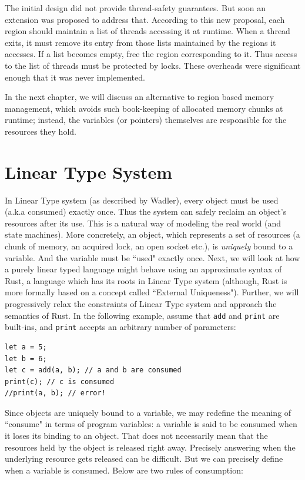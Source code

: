 \documentclass[11pt]{report}
\begin{document}
The initial design did not provide thread-safety guarantees. But soon an extension was proposed\cite{grossmanthread} to address that. According to this new proposal, each region should maintain a list of threads accessing it at runtime. When a thread exits, it must remove its entry from those lists maintained by the regions it accesses. If a list becomes empty, free the region corresponding to it. Thus access to the list of threads must be protected by locks. These overheads were significant enough that it was never implemented.

In the next chapter, we will discuss an alternative to region based memory management, which avoids such book-keeping of allocated memory chunks at runtime; instead, the variables (or pointers) themselves are responsible for the resources they hold.

\chapter{Linear Type System}

In Linear Type system (as described by Wadler\cite{linearchange}), every object must be used (a.k.a consumed) exactly once. Thus the system can safely reclaim an object's resources after its use. This is a natural way of modeling the real world (and state machines). More concretely, an object, which represents a set of resources (a chunk of memory, an acquired lock, an open socket etc.), is \textit{uniquely} bound to a variable. And the variable must be ``used" exactly once. Next, we will look at how a purely linear typed language might behave using an approximate syntax of Rust, a language which has its roots in Linear Type system (although, Rust is more formally based on a concept called ``External Uniqueness"\cite{externuniq}). Further, we will progressively relax the constraints of Linear Type system and approach the semantics of Rust. In the following example, assume that \texttt{add} and \texttt{print} are built-ins, and \texttt{print} accepts an arbitrary number of parameters:

\begin{lstlisting}
let a = 5;
let b = 6;
let c = add(a, b); // a and b are consumed
print(c); // c is consumed
//print(a, b); // error!
\end{lstlisting}

Since objects are uniquely bound to a variable, we may redefine the meaning of ``consume" in terms of program variables: a variable is said to be consumed when it loses its binding to an object. That does not necessarily mean that the resources held by the object is released right away. Precisely answering when the underlying resource gets released can be difficult. But we can precisely define when a variable is consumed. Below are two rules of consumption:
\end{document}
